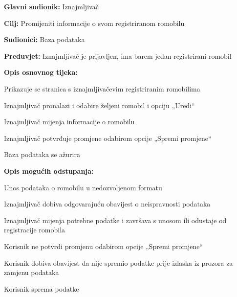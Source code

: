 						\begin{packed_item}
							
							\item \textbf{Glavni sudionik: }Iznajmljivač
							\item  \textbf{Cilj: }Promijeniti informacije o svom registriranom romobilu
							\item  \textbf{Sudionici:} Baza podataka
							\item  \textbf{Preduvjet:} Iznajmljivač je prijavljen, ima barem jedan registrirani romobil
							\item  \textbf{Opis osnovnog tijeka:}
							
							\item[] \begin{packed_enum}
								
								\item Prikazuje se stranica s iznajmljivačevim registriranim romobilima
								\item Iznajmljivač pronalazi i odabire željeni romobil i opciju „Uredi“
								\item Iznajmljivač mijenja informacije o romobilu
								\item Iznajmljivač potvrđuje promjene odabirom opcije „Spremi promjene“
								\item Baza podataka se ažurira
								
							\end{packed_enum}
							
							\item  \textbf{Opis mogućih odstupanja:}
							
							\item[] \begin{packed_item}
								
								\item[3.a] Unos podataka o romobilu u nedozvoljenom formatu
								\item[] \begin{packed_enum}
									
									\item Iznajmljivač dobiva odgovarajuću obavijest o neispravnosti podataka 
									\item Iznajmljivač mijenja potrebne podatke i završava s unosom ili odustaje od registracije romobila
									
								\end{packed_enum}
								
								\item[4.a] 	Korisnik ne potvrdi promjenu odabirom opcije „Spremi promjene“
								\item[] \begin{packed_enum}
									
									\item Korisnik dobiva obavijest da nije spremio podatke prije izlaska iz prozora za zamjenu podataka
									\item Korisnik sprema podatke
									
								\end{packed_enum}
								
								
							\end{packed_item}
						\end{packed_item}
